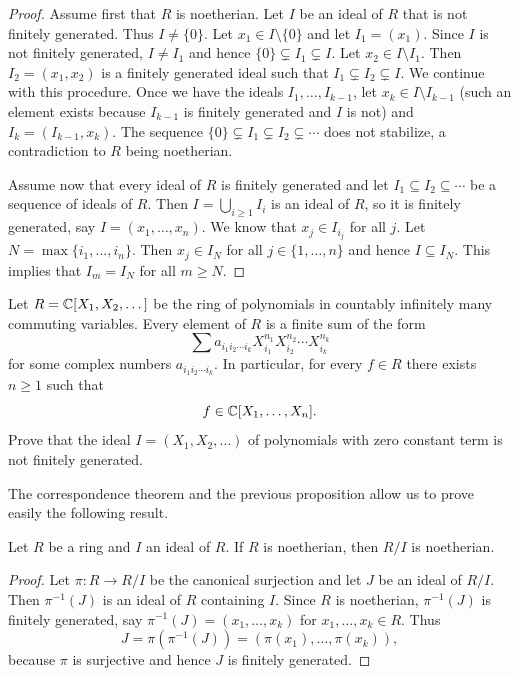 \begin{proof}
  Assume first that $R$ is noetherian. Let $I$ be an ideal of $R$ that is not
  finitely generated.  Thus $I\ne\{0\}$. Let $x_1\in I\setminus\{0\}$ and let
  $I_1=(x_1)$. Since $I$ is not finitely generated, $I\ne I_1$ and hence
  $\{0\}\subsetneq I_1\subsetneq I$. Let $x_2\in I\setminus I_1$. Then
  $I_2=(x_1,x_2)$ is a finitely generated ideal such that $I_1\subsetneq
  I_2\subsetneq I$. We continue with this procedure. Once we have the ideals
  $I_1,\dots,I_{k-1}$, let $x_k\in I\setminus I_{k-1}$ (such an element exists
  because $I_{k-1}$ is finitely generated and $I$ is not) and
  $I_k=(I_{k-1},x_k)$. The sequence $\{0\}\subsetneq I_1\subsetneq
  I_2\subsetneq\cdots$ does not stabilize, a contradiction to $R$ being 
  noetherian. 
	
	Assume now that every ideal of $R$ is finitely generated and 
	let $I_1\subseteq I_2\subseteq\cdots$ be a sequence of ideals of $R$. Then
	$I=\bigcup_{i\geq1}I_i$ is an ideal of $R$, so it is finitely generated, say
	$I=(x_1,\dots,x_n)$. We know that $x_j\in I_{i_j}$ for all $j$. Let 
	$N=\max\{i_1,\dots,i_n\}$. Then 
	$x_j\in I_N$ for all $j\in\{1,\dots,n\}$ 
	and hence $I\subseteq I_N$. This implies that 
	$I_m=I_N$ for all $m\geq N$. 
\end{proof}

\begin{exercise}
	Let $R=\mathbb{C}[X_1,X_2,\dots]$ be the ring of polynomials in 
  countably infinitely many commuting
  variables. 
	Every element of $R$ is a finite sum
	of the form 
	\[
	\sum a_{i_1i_2\cdots i_k}X_{i_1}^{n_1}X_{i_2}^{n_2}\cdots X_{i_k}^{n_k}
	\]
	for some complex numbers 
	$a_{i_1i_2\cdots i_k}$. In particular, 
  for every $f\in R$ there exists $n\geq1$
  such that
  \[
  f\in\mathbb{C}[X_1,\dots,X_n].
  \]
	Prove that the ideal $I=(X_1,X_2,\dots)$ of polynomials 
	with zero constant term is not finitely generated. 
\end{exercise}

The correspondence theorem and the previous proposition 
allow us to prove easily the following result. 

\begin{proposition}
	Let $R$ be a ring and
  $I$ an ideal of $R$. If $R$ is noetherian, then $R/I$ is noetherian.
\end{proposition}

\begin{proof}
	Let $\pi\colon R\to R/I$ be the canonical surjection and let $J$ be an ideal of $R/I$. 
	Then $\pi^{-1}(J)$ is an ideal of $R$ containing $I$. Since 
	$R$ is noetherian, $\pi^{-1}(J)$ is finitely generated, say 
	$\pi^{-1}(J)=(x_1,\dots,x_k)$ for $x_1,\dots,x_k\in R$. Thus 
	\[
	J=\pi(\pi^{-1}(J))=(\pi(x_1),\dots,\pi(x_k)),
	\]
	because $\pi$ is surjective 
	and hence $J$ is finitely generated. 
\end{proof}

